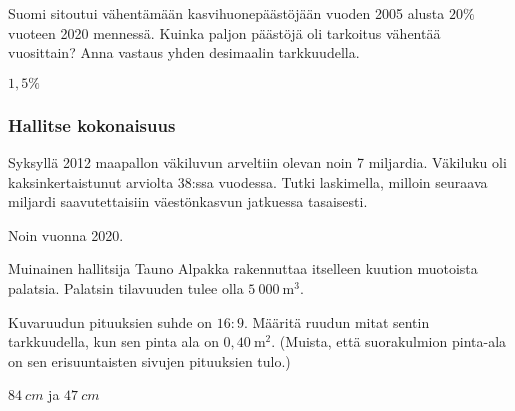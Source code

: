 \begin{tehtavasivu}
\begin{tehtava}%
Suomi sitoutui vähentämään kasvihuonepäästöjään vuoden 2005 alusta $20\%$ vuoteen 2020 mennessä. Kuinka paljon päästöjä oli tarkoitus vähentää vuosittain? Anna vastaus yhden desimaalin tarkkuudella.
\begin{vastaus}
$1,5\%$
\end{vastaus}
\end{tehtava}

\subsubsection*{Hallitse kokonaisuus}
\begin{tehtava}%
Syksyllä 2012 maapallon väkiluvun arveltiin olevan noin 7 miljardia. Väkiluku oli kaksinkertaistunut arviolta 38:ssa vuodessa. Tutki laskimella, milloin seuraava miljardi saavutettaisiin väestönkasvun jatkuessa tasaisesti.
\begin{vastaus}
Noin vuonna 2020.
\end{vastaus}
\end{tehtava}

\begin{tehtava}
Muinainen hallitsija Tauno Alpakka rakennuttaa itselleen kuution muotoista palatsia.  Palatsin tilavuuden tulee olla $5~000~\mathrm{m}^3$. 
\begin{alakohdat}
\end{alakohdat}
\begin{vastaus}
\begin{alakohdat}
\end{alakohdat}
\end{vastaus}
\end{tehtava}

\begin{tehtava}%
Kuvaruudun pituuksien suhde on $16:9$. Määritä ruudun mitat sentin tarkkuudella, kun sen pinta ala on \(0,40\ \mathrm{m}^2\). (Muista, että suorakulmion pinta-ala on sen erisuuntaisten sivujen pituuksien tulo.)
\begin{vastaus}
$84\ cm$ ja $47\ cm$
\end{vastaus}
\end{tehtava}


\end{tehtavasivu}
